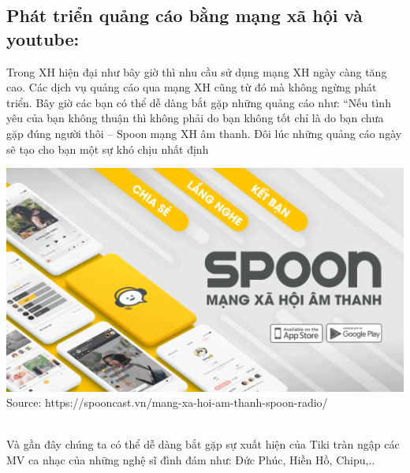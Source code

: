 \documentclass[13pt,a4paper]{article}
\begin{document}
    \subsection{Phát triển quảng cáo bằng mạng xã hội và youtube:}
    Trong XH hiện đại như bây giờ thì nhu cầu sử dụng mạng XH ngày càng tăng cao. Các dịch vụ quảng cáo qua mạng XH cũng từ đó mà không ngừng phát triển.
    Bây giờ các bạn có thể dễ dàng bắt gặp những quảng cáo như: “Nếu tình yêu của bạn không thuận thì không phải do bạn không tốt chỉ là do bạn chưa gặp đúng người thôi – Spoon mạng XH âm thanh. Đôi lúc những quảng cáo ngày sẽ tạo cho bạn một sự khó chịu nhất định
     \\\begin{center}
    \includegraphics[scale=0.25]{images/spoon.png} \\
    \fontsize{10pt}{1.2pt}\selectfont
    Source: https://spooncast.vn/mang-xa-hoi-am-thanh-spoon-radio/
    \end{center}
    \\
    Và gần đây chúng ta có thể dễ dàng bắt gặp sự xuất hiện của Tiki tràn ngập các MV ca nhạc của những nghệ sĩ đình đám như: Đức Phúc, Hiền Hồ, Chipu,..
\end{document}
